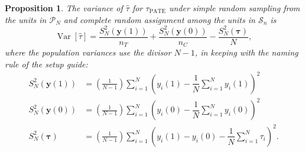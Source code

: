 \documentclass[12pt,leqno]{article}
\theoremstyle{newstyle}
\newtheorem{prop}[thm]{Proposition}
\DeclareMathOperator{\Var}{\mathrm{Var}}
\newcommand{\bZ}{\bm{Z}}   \newcommand{\bz}{\bm{z}}   %
\newcommand{\po}[2]{y_{#1}(#2)}     %
\newcommand{\pov}[1]{\bm{y}(#1)}    %
\newcommand{\tauP}{\tau_{\text{PATE}}}
\newcommand{\tauhat}{\hat{\tau}}
\newcommand{\Ssq}[2][n]{S_{#1}^{2}(#2)}
\begin{document}
\begin{prop} \label{prop: superpop var}
The variance of $\tauhat$ for $\tauP$ under simple random sampling from the units in $\mathcal{P}_N$ and complete random assignment among the units in $\mathcal{S}_n$ is
\small
\begin{equation}
\label{eq: diff means est PATE}
\Var\left[\tauhat\right] = \dfrac{\Ssq[N]{\pov{1}}}{n_T} + \dfrac{\Ssq[N]{\pov{0}}}{n_C} - \dfrac{\Ssq[N]{\bm{\tau}}}{N},
\end{equation}
\normalsize
where the population variances use the divisor $N - 1$, in keeping with the naming rule of the setup guide:
\small
\begin{align*}
\Ssq[N]{\pov{1}} & = \left(\frac{1}{N - 1}\right)\sum \limits_{i = 1}^{N} \left(\po{i}{1} - \dfrac{1}{N} \sum \limits_{i = 1}^{N} \po{i}{1}\right)^2 \\
\Ssq[N]{\pov{0}} & = \left(\frac{1}{N - 1}\right)\sum \limits_{i = 1}^{N} \left(\po{i}{0} - \dfrac{1}{N} \sum \limits_{i = 1}^{N} \po{i}{0}\right)^2 \\
\Ssq[N]{\bm{\tau}} & = \left(\frac{1}{N - 1}\right) \sum \limits_{i = 1}^{N} \left(\po{i}{1} - \po{i}{0} - \dfrac{1}{N} \sum \limits_{i = 1}^{N} \tau_i\right)^2.
\end{align*}
\normalsize
\end{prop}
\end{document}
